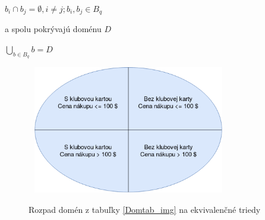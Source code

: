 \begin{center}
	\(b_{i} \cap b_{j} = \emptyset , i \neq j ; b_{i} , b_{j} \in B_{q}\)
\end{center}


a spolu pokrývajú doménu \(D\)

\begin{center}
	\( \underset{b \in B_{q}}  \bigcup b = D\)
\end{center}
\begin{figure}[h]\centering
	\centering
	\includegraphics[width=3.5in,height=2.2in]{obrazky-figures/Domeny_all_dia.png}\\[1pt]
	\caption{Rozpad domén z tabuľky \ref{Domtab_img} na ekvivalenčné triedy}
	\label{Domdia_img}
\end{figure}
